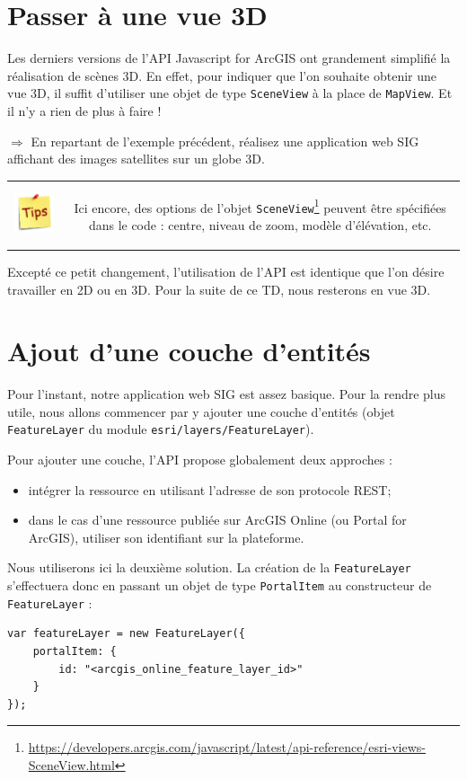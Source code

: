 \documentclass[11pt]{article}
\newcommand{\action}{$\Rightarrow$ }
\newenvironment{note}{%
	\begin{tabular}[t t]{c c}
		\includegraphics{img/tips.png}
		 &
		\begin{minipage}[c]{0.9\linewidth}
			\begin{sffamily}
}{%
			\end{sffamily}
		\end{minipage}
	\end{tabular}
}
\newcommand{\code}[1]{\lstinline{#1}}
\begin{document}
\section{Passer à une vue 3D}
Les derniers versions de l'API Javascript for ArcGIS ont grandement simplifié la réalisation de scènes 3D. En effet, pour indiquer que l'on souhaite obtenir une vue 3D, il suffit d'utiliser une objet de type \code{SceneView} à la place de \code{MapView}. Et il n'y a rien de plus à faire !

\action En repartant de l'exemple précédent, réalisez une application web SIG affichant des images satellites sur un globe 3D.

\begin{note}
Ici encore, des options de l'objet \code{SceneView}\footnote{\url{https://developers.arcgis.com/javascript/latest/api-reference/esri-views-SceneView.html}} peuvent être spécifiées dans le code : centre, niveau de zoom, modèle d'élévation, etc.
\end{note}

Excepté ce petit changement, l'utilisation de l'API est identique que l'on désire travailler en 2D ou en 3D. Pour la suite de ce TD, nous resterons en vue 3D.



\section{Ajout d'une couche d'entités}
Pour l'instant, notre application web SIG est assez basique. Pour la rendre plus utile, nous allons commencer par y ajouter une couche d'entités (objet \code{FeatureLayer} du module \code{esri/layers/FeatureLayer}).

Pour ajouter une couche, l'API propose globalement deux approches :
\begin{itemize}
	\item intégrer la ressource en utilisant l'adresse de son protocole REST;
	\item dans le cas d'une ressource publiée sur ArcGIS Online (ou Portal for ArcGIS), utiliser son identifiant sur la plateforme.
\end{itemize}

Nous utiliserons ici la deuxième solution. La création de la \code{FeatureLayer} s'effectuera donc en passant un objet de type \code{PortalItem} au constructeur de \code{FeatureLayer} :
\begin{lstlisting}
var featureLayer = new FeatureLayer({
	portalItem: {
		id: "<arcgis_online_feature_layer_id>"
	}
});
\end{lstlisting}
\end{document}
